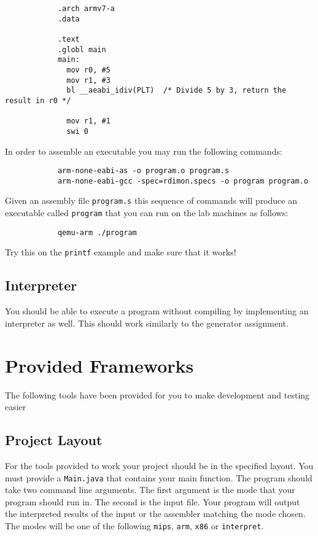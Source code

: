 \documentclass{article}
\begin{document}
		\begin{lstlisting}
			.arch armv7-a
			.data
			
			.text
			.globl main
			main:
			  mov r0, #5
			  mov r1, #3
			  bl __aeabi_idiv(PLT)  /* Divide 5 by 3, return the result in r0 */
			
			  mov r1, #1
			  swi 0
		\end{lstlisting}
			
		In order to assemble an executable you may run the following commands:
		
		\begin{lstlisting}
			arm-none-eabi-as -o program.o program.s
			arm-none-eabi-gcc -spec=rdimon.specs -o program program.o
		\end{lstlisting}
		
		Given an assembly file \texttt{program.s} this sequence of commands will produce an executable called
		\texttt{program} that you can run on the lab machines as follows:
		
		\begin{lstlisting}
			qemu-arm ./program
		\end{lstlisting}
		
		Try this on the \texttt{printf} example and make sure that it works!

			
	\subsection{Interpreter}

		You should be able to execute a program without compiling by implementing an interpreter as well. This should
		work similarly to the generator assignment.

\section{Provided Frameworks}

	The following tools have been provided for you to make development and testing easier 

	\subsection{Project Layout}
	
		For the tools provided to work your project should be in the specified layout. You must provide a \texttt{Main.java} that contains your main function. The program should take two command line arguments. The first argument is the mode that your program should run in. The second is the input file. Your program will output the interpreted results of the input or the assembler matching the mode chosen. The modes will be one of the following \texttt{mips}, \texttt{arm}, \texttt{x86} or \texttt{interpret}.
		
\end{document}
